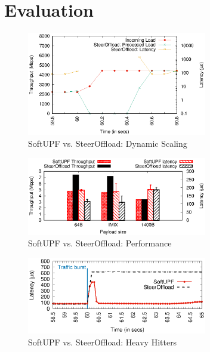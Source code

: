 \section{Evaluation}
\begin{figure}[htbp]
	\centering
	\includegraphics[width=0.7\textwidth]{fig/dynScaling_SteerOffload.eps}
	\setlength{\belowcaptionskip}{-12pt}
	\caption{SoftUPF vs. SteerOffload: Dynamic Scaling}
	\label{fig:dynamicScaling}
\end{figure}
\begin{figure}[htbp]
	\centering
	\includegraphics[width=0.7\textwidth]{fig/pipelineVsRTT.eps}
	\setlength{\belowcaptionskip}{-12pt}

	\caption{SoftUPF vs. SteerOffload: Performance}
	
	\label{fig:UPFABperformance}
\end{figure}
\begin{figure}[htbp]
	\centering
	\includegraphics[width=0.7\textwidth]{fig/heavyHitter.eps}
	\setlength{\belowcaptionskip}{-12pt}
	\caption{SoftUPF vs. SteerOffload: Heavy Hitters}
	\label{fig:HeavyHitter}
\end{figure}

